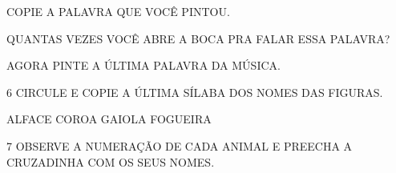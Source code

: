 \begin{escola}
\begin{escolha}
\item COPIE A PALAVRA QUE VOCÊ PINTOU.



\item QUANTAS VEZES VOCÊ ABRE A BOCA PRA FALAR ESSA PALAVRA?


\item AGORA PINTE A ÚLTIMA PALAVRA DA MÚSICA.
\end{escolha}

\num{6} CIRCULE E COPIE A ÚLTIMA SÍLABA DOS NOMES DAS FIGURAS.


ALFACE COROA GAIOLA FOGUEIRA




\num{7} OBSERVE A NUMERAÇÃO DE CADA ANIMAL E PREECHA A CRUZADINHA COM OS SEUS NOMES.





\end{escola}
